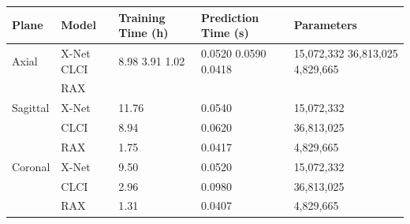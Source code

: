 \begin{table}[htbp]
\centering
\label{tab:table\_006}
\begin{tabular}{lllll}
\hline
Plane & Model & Training Time (h) & Prediction Time (s) & Parameters \\
\hline
Axial & X-Net CLCI & 8.98 3.91 1.02 & 0.0520 0.0590 0.0418 & 15,072,332 36,813,025 4,829,665 \\
 & RAX &  &  &  \\
Sagittal & X-Net & 11.76 & 0.0540 & 15,072,332 \\
 & CLCI & 8.94 & 0.0620 & 36,813,025 \\
 & RAX & 1.75 & 0.0417 & 4,829,665 \\
Coronal & X-Net & 9.50 & 0.0520 & 15,072,332 \\
 & CLCI & 2.96 & 0.0980 & 36,813,025 \\
 & RAX & 1.31 & 0.0407 & 4,829,665 \\
\hline
\end{tabular}
\end{table}
